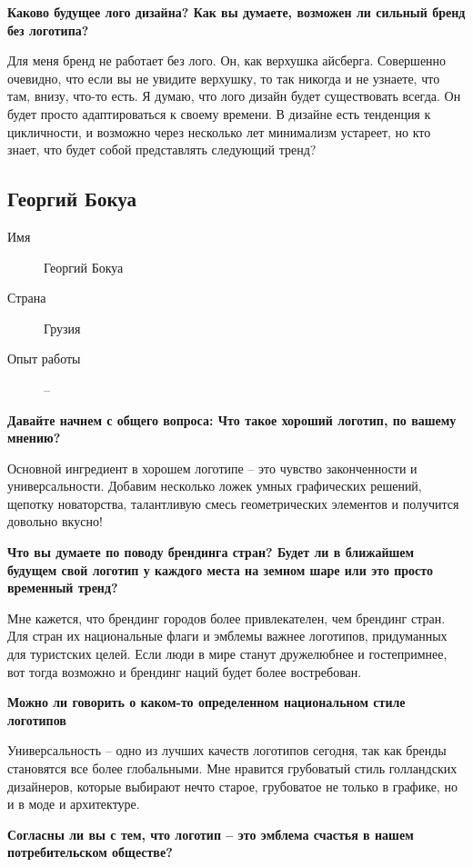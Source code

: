 \textbf{Каково будущее лого дизайна? Как вы думаете, возможен ли сильный бренд без логотипа?}

Для меня бренд не работает без лого. Он, как верхушка айсберга. Совершенно очевидно, что если вы не увидите верхушку, то так никогда и не узнаете, что там, внизу, что-то есть. Я думаю, что лого дизайн будет существовать всегда. Он будет просто адаптироваться к своему времени. В дизайне есть тенденция к цикличности, и возможно через несколько лет минимализм устареет, но кто знает, что будет собой представлять следующий тренд?


\clearpage
\subsection{Георгий Бокуа}

\begin{description}
\item[Имя] Георгий Бокуа
\item[Страна] Грузия
\item[Опыт работы] --
\end{description}

\textbf{Давайте начнем с общего вопроса: Что такое хороший логотип, по вашему мнению?}

Основной ингредиент в хорошем логотипе – это чувство законченности и универсальности. Добавим несколько ложек умных графических решений, щепотку новаторства, талантливую смесь геометрических элементов и получится довольно вкусно!

\textbf{Что вы думаете по поводу брендинга стран? Будет ли в ближайшем будущем свой логотип у каждого места на земном шаре или это просто временный тренд?}

Мне кажется, что брендинг городов более привлекателен, чем брендинг стран. Для стран их национальные флаги и эмблемы важнее логотипов, придуманных для туристских целей. Если люди в мире станут дружелюбнее и гостепримнее, вот тогда возможно и брендинг наций будет более востребован.


\textbf{Можно ли говорить о каком-то определенном национальном стиле логотипов}

Универсальность – одно из лучших качеств логотипов сегодня, так как бренды становятся все более глобальными. Мне нравится грубоватый стиль голландских дизайнеров, которые выбирают нечто старое, грубоватое не только в графике, но и в моде и архитектуре.


\textbf{Согласны ли вы с тем, что логотип – это эмблема счастья в нашем потребительском обществе?}

